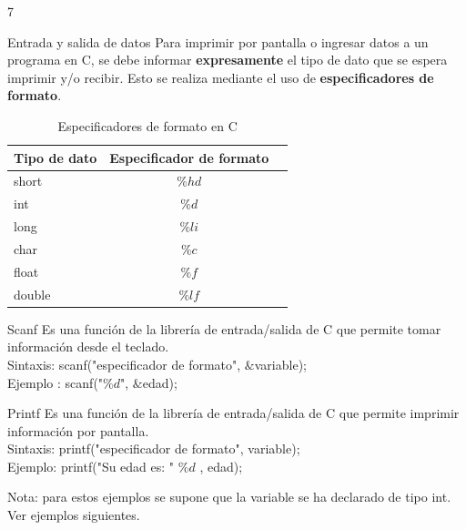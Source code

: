 7\documentclass[xcolor=pdftex,table,11pt]{beamer}
\begin{document}
\begin{frame}[allowframebreaks] {Entrada y salida de datos}
Para imprimir por pantalla o ingresar datos a un programa en C, se debe informar \textbf{expresamente} el tipo de dato que se espera imprimir y/o recibir.
Esto se realiza mediante el uso de \textbf{especificadores de formato}.

\begin{table}
\begin{tabular}{l | c | l }
Tipo de dato & Especificador de formato \\
\hline \hline
short & $\%hd$ \\ 
int & 	$\%d$ \\ 
long & 	$\%li$ \\ 
char & $\%c$\\ 
float & $\%f$ \\ 
double & $\%lf$\\ 
\end{tabular}
\caption{Especificadores de formato en C}
\end{table}
 \begin{block}{Scanf}
Es una función de la librería de entrada/salida de C que permite tomar información desde el teclado.\\ 

Sintaxis: scanf("especificador de formato", $\&$variable); \\ 
Ejemplo	: scanf("$\%d$", $\&$edad); \\ 
    \end{block}

 \begin{block}{Printf}
Es una función de la librería de entrada/salida de C que permite imprimir información por pantalla.\\ 
Sintaxis: printf("especificador de formato", variable); \\ 
Ejemplo: printf("Su edad es: " $\%d$ , edad);
    \end{block}
    
Nota: para estos ejemplos se supone que la variable se ha declarado de tipo int. Ver ejemplos siguientes.
\codesetstylefrombeamer
{}
\end{frame}
\end{document}
